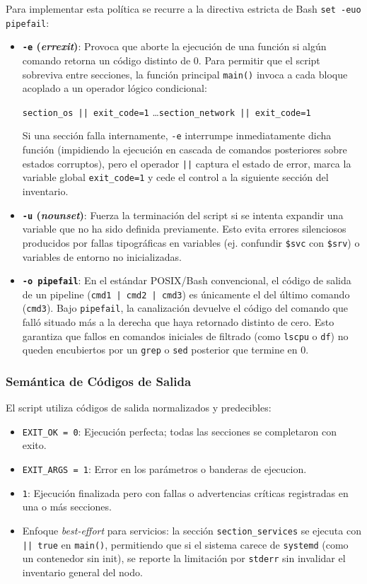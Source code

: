 \documentclass[11pt,a4paper]{article}
\begin{document}
Para implementar esta política se recurre a la directiva estricta de Bash \texttt{set -euo pipefail}:
\begin{itemize}[leftmargin=*]
    \item \textbf{\texttt{-e} (\textit{errexit})}: Provoca que aborte la ejecución de una función si algún comando retorna un código distinto de 0. Para permitir que el script sobreviva entre secciones, la función principal \texttt{main()} invoca a cada bloque acoplado a un operador lógico condicional:
    \begin{center}
    \texttt{section\_os || exit\_code=1} \quad \dots \quad \texttt{section\_network || exit\_code=1}
    \end{center}
    Si una sección falla internamente, \texttt{-e} interrumpe inmediatamente dicha función (impidiendo la ejecución en cascada de comandos posteriores sobre estados corruptos), pero el operador \texttt{||} captura el estado de error, marca la variable global \texttt{exit\_code=1} y cede el control a la siguiente sección del inventario.
    \item \textbf{\texttt{-u} (\textit{nounset})}: Fuerza la terminación del script si se intenta expandir una variable que no ha sido definida previamente. Esto evita errores silenciosos producidos por fallas tipográficas en variables (ej. confundir \texttt{\$svc} con \texttt{\$srv}) o variables de entorno no inicializadas.
    \item \textbf{\texttt{-o pipefail}}: En el estándar POSIX/Bash convencional, el código de salida de un pipeline (\texttt{cmd1 | cmd2 | cmd3}) es únicamente el del último comando (\texttt{cmd3}). Bajo \texttt{pipefail}, la canalización devuelve el código del comando que falló situado más a la derecha que haya retornado distinto de cero. Esto garantiza que fallos en comandos iniciales de filtrado (como \texttt{lscpu} o \texttt{df}) no queden encubiertos por un \texttt{grep} o \texttt{sed} posterior que termine en 0.
\end{itemize}

\subsubsection{Semántica de Códigos de Salida}
El script utiliza códigos de salida normalizados y predecibles:
\begin{itemize}[leftmargin=*]
    \item \texttt{EXIT\_OK = 0}: Ejecución perfecta; todas las secciones se completaron con exito.
    \item \texttt{EXIT\_ARGS = 1}: Error en los parámetros o banderas de ejecucion.
    \item \texttt{1}: Ejecución finalizada pero con fallas o advertencias críticas registradas en una o más secciones.
    \item Enfoque \textit{best-effort} para servicios: la sección \texttt{section\_services} se ejecuta con \texttt{|| true} en \texttt{main()}, permitiendo que si el sistema carece de \texttt{systemd} (como un contenedor sin init), se reporte la limitación por \texttt{stderr} sin invalidar el inventario general del nodo.
\end{itemize}
\end{document}
